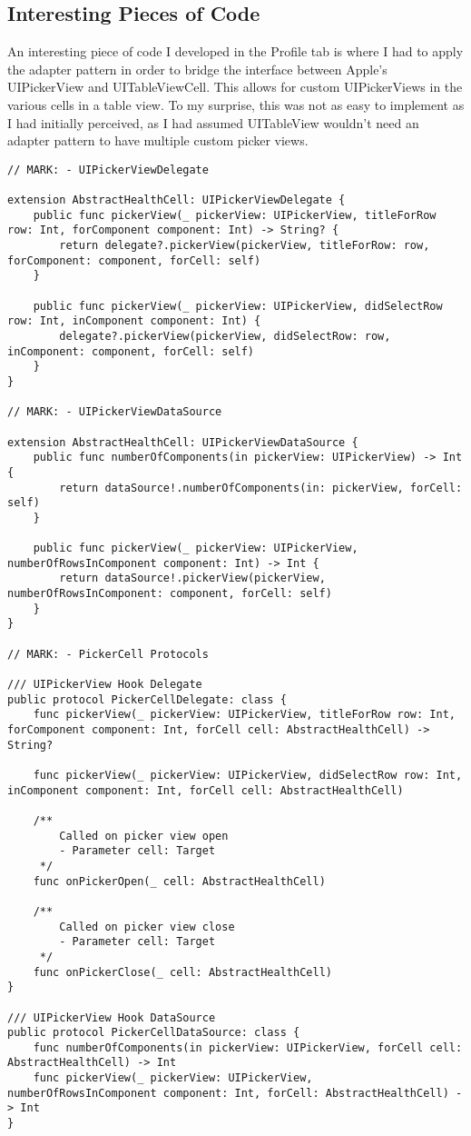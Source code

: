\documentclass[a4paper]{article}
\begin{document}
\subsection{Interesting Pieces of Code}

An interesting piece of code I developed in the Profile tab is where I had to apply the adapter pattern in order to bridge the interface between Apple's UIPickerView and UITableViewCell. This allows for custom UIPickerViews in the various cells in a table view. To my surprise, this was not as easy to implement as I had initially perceived, as I had assumed UITableView wouldn't need an adapter pattern to have multiple custom picker views.

\begin{verbatim}
// MARK: - UIPickerViewDelegate

extension AbstractHealthCell: UIPickerViewDelegate {
    public func pickerView(_ pickerView: UIPickerView, titleForRow row: Int, forComponent component: Int) -> String? {
        return delegate?.pickerView(pickerView, titleForRow: row, forComponent: component, forCell: self)
    }

    public func pickerView(_ pickerView: UIPickerView, didSelectRow row: Int, inComponent component: Int) {
        delegate?.pickerView(pickerView, didSelectRow: row, inComponent: component, forCell: self)
    }
}

// MARK: - UIPickerViewDataSource

extension AbstractHealthCell: UIPickerViewDataSource {
    public func numberOfComponents(in pickerView: UIPickerView) -> Int {
        return dataSource!.numberOfComponents(in: pickerView, forCell: self)
    }

    public func pickerView(_ pickerView: UIPickerView, numberOfRowsInComponent component: Int) -> Int {
        return dataSource!.pickerView(pickerView, numberOfRowsInComponent: component, forCell: self)
    }
}

// MARK: - PickerCell Protocols

/// UIPickerView Hook Delegate
public protocol PickerCellDelegate: class {
    func pickerView(_ pickerView: UIPickerView, titleForRow row: Int, forComponent component: Int, forCell cell: AbstractHealthCell) -> String?

    func pickerView(_ pickerView: UIPickerView, didSelectRow row: Int, inComponent component: Int, forCell cell: AbstractHealthCell)

    /**
        Called on picker view open
        - Parameter cell: Target
     */
    func onPickerOpen(_ cell: AbstractHealthCell)

    /**
        Called on picker view close
        - Parameter cell: Target
     */
    func onPickerClose(_ cell: AbstractHealthCell)
}

/// UIPickerView Hook DataSource
public protocol PickerCellDataSource: class {
    func numberOfComponents(in pickerView: UIPickerView, forCell cell: AbstractHealthCell) -> Int
    func pickerView(_ pickerView: UIPickerView, numberOfRowsInComponent component: Int, forCell: AbstractHealthCell) -> Int
}
\end{verbatim}
\end{document}
